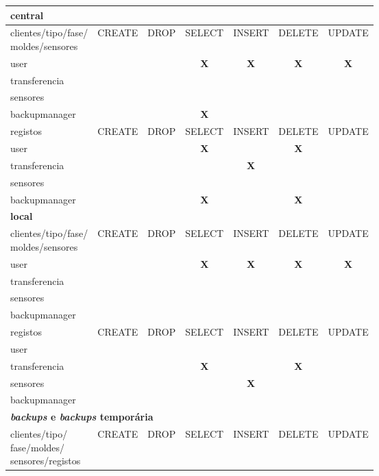 \documentclass[11pt,twoside,a4paper]{report}
\begin{document}
\begin{table}
	\centering
	\begin{tabular}{|l|c|c|c|c|c|c|}
		\multicolumn{7}{l}{\textbf{central}} \\ \hline
		\makecell{clientes/tipo/fase/\\moldes/sensores} & CREATE & DROP & SELECT & INSERT & DELETE & UPDATE \\ \hline
		user & & & \textbf{X} & \textbf{X} & \textbf{X} & \textbf{X} \\ \hline
		transferencia & & & & & & \\ \hline
		sensores & & & & & & \\ \hline
		backupmanager & & & \textbf{X} & & & \\ \hline
		registos & CREATE & DROP & SELECT & INSERT & DELETE & UPDATE \\ \hline
		user & & & \textbf{X} & & \textbf{X} & \\ \hline
		transferencia & & & & \textbf{X} & & \\ \hline
		sensores & & & & & & \\ \hline
		backupmanager & & & \textbf{X} & & \textbf{X} & \\ \hline
		\multicolumn{7}{l}{\textbf{local}} \\ \hline
		\makecell{clientes/tipo/fase/\\moldes/sensores} & CREATE & DROP & SELECT & INSERT & DELETE & UPDATE \\ \hline
		user & & & \textbf{X} & \textbf{X} & \textbf{X} & \textbf{X} \\ \hline
		transferencia & & & & & & \\ \hline
		sensores & & & & & & \\ \hline
		backupmanager & & & & & & \\ \hline
		registos & CREATE & DROP & SELECT & INSERT & DELETE & UPDATE \\ \hline
		user & & & & & & \\ \hline
		transferencia & & & \textbf{X} & & \textbf{X} & \\ \hline
		sensores & & & & \textbf{X} & & \\ \hline
		backupmanager & & & & & & \\ \hline
		\multicolumn{7}{l}{\textbf{\textit{backups} e \textit{backups} temporária}} \\ \hline
		\makecell{clientes/tipo/\\fase/moldes/\\sensores/registos} & CREATE & DROP & SELECT & INSERT & DELETE & UPDATE \\ \hline

\end{tabular}
\end{table}
\end{document}
